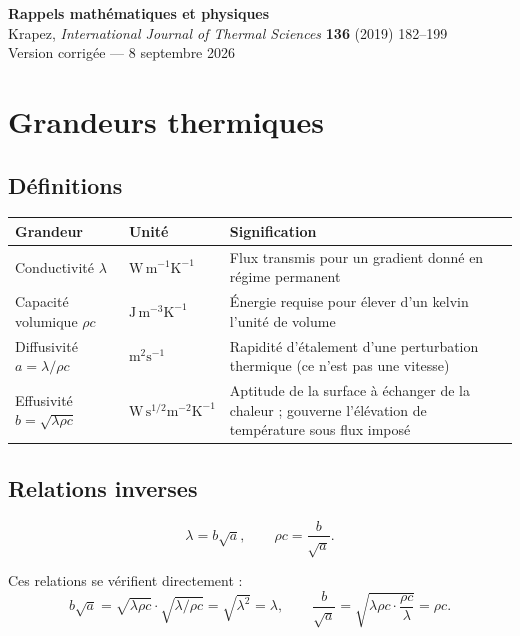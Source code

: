 \documentclass[11pt,a4paper]{article}
\begin{document}
\begin{center}
{\Large\bfseries Rappels mathématiques et physiques}\\[4pt]
{\small Krapez, \emph{International Journal of Thermal Sciences} \textbf{136} (2019) 182--199}\\[2pt]
{\small Version corrigée --- 8 septembre 2026}
\end{center}

\vspace{4pt}


\section{Grandeurs thermiques}

\subsection{Définitions}

\begin{center}
\begin{tabularx}{\textwidth}{@{}llX@{}}
\toprule
\textbf{Grandeur} & \textbf{Unité} & \textbf{Signification} \\
\midrule
Conductivité $\lambda$ & $\mathrm{W\,m^{-1}K^{-1}}$ & Flux transmis pour un gradient donné en régime
permanent \\
\addlinespace
Capacité volumique $\rho c$ & $\mathrm{J\,m^{-3}K^{-1}}$ & Énergie requise pour élever d'un kelvin
l'unité de volume \\
\addlinespace
Diffusivité $a = \lambda/\rho c$ & $\mathrm{m^{2}s^{-1}}$ & Rapidité d'étalement d'une perturbation
thermique (ce n'est pas une vitesse) \\
\addlinespace
Effusivité $b = \sqrt{\lambda\rho c}$ & $\mathrm{W\,s^{1/2}m^{-2}K^{-1}}$ & Aptitude de la surface à
échanger de la chaleur ; gouverne l'élévation de température sous flux imposé \\
\bottomrule
\end{tabularx}
\end{center}

\subsection{Relations inverses}

\[ \lambda = b\sqrt{a} , \qquad \rho c = \frac{b}{\sqrt{a}} . \]

Ces relations se vérifient directement :
\[ b\sqrt{a} = \sqrt{\lambda\rho c}\cdot\sqrt{\lambda/\rho c} = \sqrt{\lambda^{2}} = \lambda ,
\qquad
\frac{b}{\sqrt{a}} = \sqrt{\lambda\rho c \cdot \frac{\rho c}{\lambda}} = \rho c . \]
\end{document}
